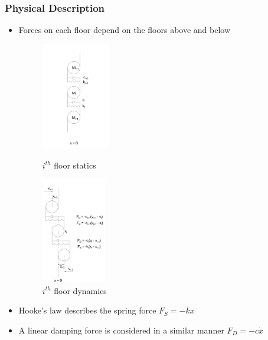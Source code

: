 \documentclass[xcolor=svgnames,9pt]{beamer}
\theoremstyle{remark}
\begin{document}
		\begin{frame}
  			\frametitle{Physical Description}
			\begin{itemize}
				\item Forces on each floor depend on the floors above and below
				\begin{figure}
 				 	\begin{minipage}[b]{0.4\textwidth}
						\centering
    						\includegraphics[width=30mm]{pictures/SPRINGS-Model2A.jpg}
    						\caption{$i^{th}$ floor statics}
						\label{Springs2}
  					\end{minipage}
 					\hfill
					\begin{minipage}[b]{0.4\textwidth}
						\centering
 				  		\includegraphics[width=28mm]{pictures/SPRINGS-Model3A.jpg}
    						\caption{$i^{th}$ floor dynamics}
						\label{Springs3}
 					\end{minipage}
				\end{figure}
				\item Hooke's law describes the spring force $F_S = - kx$
				\item A linear damping force is considered in a similar manner $F_D = - c\dot{x}$
			\end{itemize}

		\end{frame}
\end{document}
